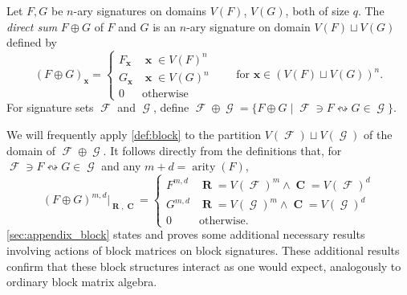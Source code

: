 \documentclass{theoretics}
\DeclareMathOperator{\arity}{arity}
\DeclareMathOperator{\vx}{\mathbf{x}}
\DeclareMathOperator{\vr}{\mathbf{R}}
\DeclareMathOperator{\vc}{\mathbf{C}}
\DeclareMathOperator{\fc}{\mathcal{F}}
\DeclareMathOperator{\gc}{\mathcal{G}}
\begin{document}
\begin{definition}[$\oplus$]
\label{def:oplus-f-g}
    Let $F,G$ be $n$-ary signatures on domains $V(F)$, $V(G)$, both of size $q$.
    The \emph{direct sum} $F \oplus G$ of $F$ and $G$ is an
    $n$-ary signature on domain $V(F) \sqcup V(G)$ defined by
    \[
        (F \oplus G)_{\vx} = \begin{cases} 
            F_{\vx} & \vx \in V(F)^n \\
            G_{\vx} & \vx \in V(G)^n \\
            0 & \text{otherwise}
        \end{cases}
        \qquad\text{for } \mathbf{x} \in (V(F) \sqcup V(G))^n.
    \]
    For signature sets $\fc$ and $\gc$, define 
    $\fc \oplus \gc = \{F \oplus G \mid \fc \ni F \leftrightsquigarrow G \in \gc\}$.
\end{definition}
We will frequently apply \autoref{def:block} to the partition $V(\fc) \sqcup V(\gc)$ of the domain
of $\fc\oplus\gc$.
It follows directly from the definitions that, for $\fc \ni F \leftrightsquigarrow G \in \gc$ and any 
$m+d = \arity(F)$,
\begin{equation}
    (F \oplus G)^{m,d}|_{\vr,\vc} = 
    \begin{cases}
        F^{m,d} & \vr = V(\fc)^m \wedge \vc = V(\fc)^d \\ G^{m,d} & \vr = V(\gc)^m \wedge \vc = V(\gc)^d \\ 0 & \text{otherwise}.
    \end{cases}
    \label{eq:oplus_index}
\end{equation}
\autoref{sec:appendix_block} states and proves some additional necessary results involving 
actions of block matrices on block signatures.
These additional results confirm that these block structures interact as
one would expect, analogously to ordinary block matrix algebra.

\end{document}

